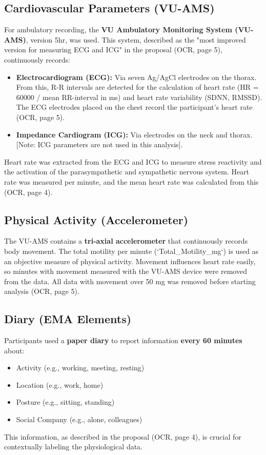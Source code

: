 \documentclass[11pt, a4paper]{report}
\begin{document}
\subsection{Cardiovascular Parameters (VU-AMS)}
\label{subsec:measurement_cv} %
For ambulatory recording, the \textbf{VU Ambulatory Monitoring System (VU-AMS)}, version 5hr, was used. This system, described as the "most improved version for measuring ECG and ICG" in the proposal \cite{ThesisTempPDF} (OCR, page 5), continuously records:
\begin{itemize}
    \item \textbf{Electrocardiogram (ECG):} Via seven Ag/AgCl electrodes on the thorax. From this, R-R intervals are detected for the calculation of heart rate (HR = 60000 / mean RR-interval in ms) and heart rate variability (SDNN, RMSSD). The ECG electrodes placed on the chest record the participant's heart rate \cite{ThesisTempPDF} (OCR, page 5).
    \item \textbf{Impedance Cardiogram (ICG):} Via electrodes on the neck and thorax. [Note: ICG parameters are not used in this analysis].
\end{itemize}
Heart rate was extracted from the ECG and ICG to measure stress reactivity and the activation of the parasympathetic and sympathetic nervous system. Heart rate was measured per minute, and the mean heart rate was calculated from this \cite{ThesisTempPDF} (OCR, page 4).

\subsection{Physical Activity (Accelerometer)}
\label{subsec:measurement_activity_method} %
The VU-AMS contains a \textbf{tri-axial accelerometer} that continuously records body movement. The total motility per minute (`Total_Motility_mg`) is used as an objective measure of physical activity. Movement influences heart rate easily, so minutes with movement measured with the VU-AMS device were removed from the data. All data with movement over 50 mg was removed before starting analysis \cite{ThesisTempPDF} (OCR, page 5).

\subsection{Diary (EMA Elements)}
\label{subsec:measurement_diary} %
Participants used a \textbf{paper diary} to report information \textbf{every 60 minutes} about:
\begin{itemize}
    \item Activity (e.g., working, meeting, resting)
    \item Location (e.g., work, home)
    \item Posture (e.g., sitting, standing)
    \item Social Company (e.g., alone, colleagues)
\end{itemize}
This information, as described in the proposal \cite{ThesisTempPDF} (OCR, page 4), is crucial for contextually labeling the physiological data.
\end{document}
